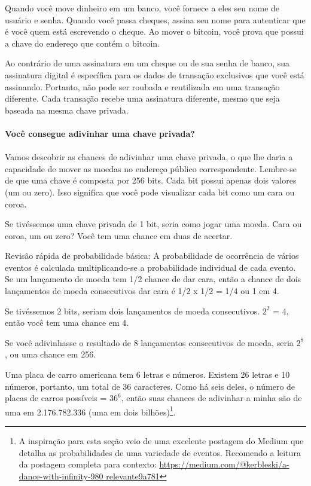Quando você move dinheiro em um banco, você fornece a eles seu nome de usuário e senha. Quando você passa cheques, assina seu nome para autenticar que é você quem está escrevendo o cheque. Ao mover o bitcoin, você prova que possui a chave do endereço que contém o bitcoin.

Ao contrário de uma assinatura em um cheque ou de sua senha de banco, sua assinatura digital é específica para os dados de transação exclusivos que você está assinando. Portanto, não pode ser roubada e reutilizada em uma transação diferente. Cada transação recebe uma assinatura diferente, mesmo que seja baseada na mesma chave privada.
\newpage
\paragraph{Você consegue adivinhar uma chave privada?}
\paragraph{}

Vamos descobrir as chances de adivinhar uma chave privada, o que lhe daria a capacidade de mover as moedas no endereço público correspondente. Lembre-se de que uma chave é composta por 256 bits. Cada bit possui apenas dois valores (um ou zero). Isso significa que você pode visualizar cada bit como um cara ou coroa.

Se tivéssemos uma chave privada de 1 bit, seria como jogar uma moeda. Cara ou coroa, um ou zero? Você tem uma chance em duas de acertar.

Revisão rápida de probabilidade básica: A probabilidade de ocorrência de vários eventos é calculada multiplicando-se a probabilidade individual de cada evento. Se um lançamento de moeda tem 1/2 chance de dar cara, então a chance de dois lançamentos de moeda consecutivos dar cara é 1/2 x 1/2 = 1/4 ou 1 em 4.

Se tivéssemos 2 bits, seriam dois lançamentos de moeda consecutivos. \(2^2\) = 4, então você tem uma chance em 4.

Se você adivinhasse o resultado de 8 lançamentos consecutivos de moeda, seria \(2^8\), ou uma chance em 256.

Uma placa de carro americana tem 6 letras e números. Existem 26 letras e 10 números, portanto, um total de 36 caracteres. Como há seis deles, o número de placas de carros possíveis = \(36^6\), então suas chances de adivinhar a minha são de uma em 2.176.782.336 (uma em dois bilhões)\footnote{A inspiração para esta seção veio de uma excelente postagem do Medium que detalha as probabilidades de uma variedade de eventos. Recomendo a leitura da postagem completa para contexto: \url{https://medium.com/@kerbleski/a-dance-with-infinity-980 relevante9a781}}.

